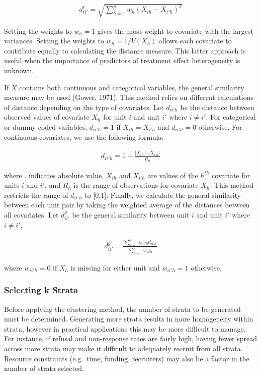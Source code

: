 \documentclass[man,floatsintext]{apa6}
\theoremstyle{definition}
\theoremstyle{definition}
\theoremstyle{definition}
\theoremstyle{remark}
\begin{document}
\begin{align}
  d^{e}_{ii'} = \sqrt{\sum^{p}_{h=1} w_h (X_{ih} - X_{i'h})^2}
\end{align}

Setting the weights to \(w_h = 1\) gives the most weight to covariate
with the largest variances. Setting the weights to \(w_h = 1/V(X_h)\)
allows each covariate to contribute equally to calculating the distance
measure. This latter approach is useful when the importance of
predictors of treatment effect heterogeneity is unknown.

If \(X\) contains both continuous and categorical variables, the general
similarity measure may be used (Gower, 1971). This method relies on
different calculations of distance depending on the type of covariates.
Let \(d_{ii'h}\) be the distance between observed values of covariate
\(X_{h}\) for unit \(i\) and unit \(i'\) where \(i \ne i'\). For
categorical or dummy coded variables, \(d_{ii'h} = 1\) if
\(X_{ih} = X_{i'h}\) and \(d_{ii'h} = 0\) otherwise. For continuous
covariates, we use the following formula:

\begin{align}
  d_{ii'h} = 1 - \frac{|X_{ih} - X_{i'h}|}{R_h}
\end{align}

where \textbar{}.\textbar{} indicates absolute value, \(X_{ih}\) and
\(X_{i'h}\) are values of the \(h^{th}\) covariate for units \(i\) and
\(i'\), and \(R_h\) is the range of observations for covariate \(X_h\).
This method restricts the range of \(d_{ii'h}\) to {[}0,1{]}. Finally,
we calculate the general similarity between each unit pair by taking the
weighted average of the distances between all covariates. Let
\(d^{g}_{ii'}\) be the general similarity between unit \(i\) and unit
\(i'\) where \(i \ne i'\).

\begin{align}
  d^{g}_{ii'} = \frac{\sum^p_{h = 1}w_{ii'h}d_{ii'h}}{\sum^p_{h = 1}w_{ii'h}}
\end{align}

where \(w_{ii'h} = 0\) if \(X_h\) is missing for either unit and
\(w_{ii'h} = 1\) otherwise.

\hypertarget{selecting-k-strata}{%
\subsubsection{Selecting k Strata}\label{selecting-k-strata}}

Before applying the clustering method, the number of strata to be
generated must be determined. Generating more strata results in more
homogeneity within strata, however in practical applications this may be
more difficult to manage. For instance, if refusal and non-response
rates are fairly high, having fewer spread across more strata may make
it difficult to adequately recruit from all strata. Resource constraints
(e.g.~time, funding, recruiters) may also be a factor in the number of
strata selected.
\end{document}
